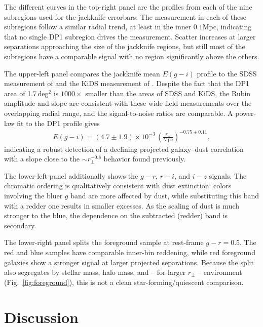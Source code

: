 \documentclass[linenumbers, twocolumn]{aastex701}
\begin{document}
The different curves in the top-right panel are the profiles from each of the nine subregions used for the jackknife errorbars.
The measurement in each of these subregions follow a similar radial trend, at least in the inner $0.1$Mpc, indicating that no single DP1 subregion drives the measurement.
Scatter increases at larger separations approaching the size of the jackknife regions, but still most of the subregions have a comparable signal with no region significantly above the others.

The upper-left panel compares the jackknife mean $E(g-i)$ profile to the SDSS measurement of \citet{menard2010} and the KiDS measurement of \citet{genc2025}.
Despite the fact that the DP1 area of 1.7\,deg$^2$ is $1000\times$ smaller than the areas of SDSS and KiDS, the Rubin amplitude and slope are consistent with these wide-field measurements over the overlapping radial range, and the signal-to-noise ratios are comparable.
A power-law fit to the DP1 profile gives
\begin{align}
    E(g-i) = (4.7 \pm 1.9) \times 10^{-3} \, \left( \frac{r_\perp}{\mathrm{Mpc}} \right)^{-0.75 \pm 0.11},
\end{align}
indicating a robust detection of a declining projected galaxy--dust correlation with a slope close to the $\sim r_\perp^{-0.8}$ behavior found previously.

The lower-left panel additionally shows the $g-r$, $r-i$, and $i-z$ signals.
The chromatic ordering is qualitatively consistent with dust extinction: colors involving the bluer $g$ band are more affected by dust, while substituting this band with a redder one results in smaller excesses.
As the scaling of dust is much stronger to the blue, the dependence on the subtracted (redder) band is secondary.

The lower-right panel splits the foreground sample at rest-frame $g-r=0.5$.
The red and blue samples have comparable inner-bin reddening, while red foreground galaxies show a stronger signal at larger projected separations.
Because the split also segregates by stellar mass, halo mass, and -- for larger $r_\perp$ -- environment (Fig.~\ref{fig:foreground}), this is not a clean star-forming/quiescent comparison.


\section{Discussion}
\label{sec:discussion}
\end{document}
